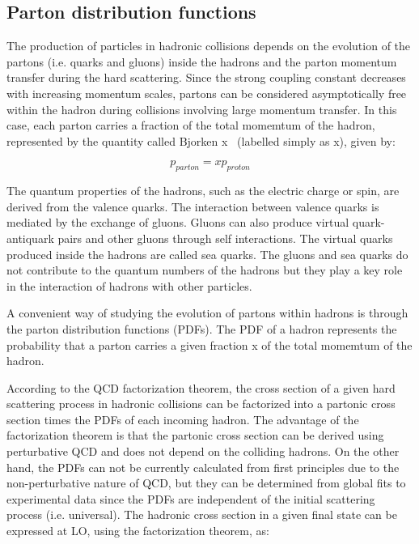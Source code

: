 \subsection{Parton distribution functions}\label{sec:PDF}

The production of particles in hadronic collisions depends on the evolution of the partons (i.e. quarks and gluons) inside the hadrons and the parton momentum transfer during the hard scattering. Since the strong coupling constant decreases with increasing momentum scales, partons can be considered asymptotically free within the hadron during collisions involving large momentum transfer. In this case, each parton carries a fraction of the total momemtum of the hadron, represented by the quantity called Bjorken x~\cite{BjorkenX} (labelled simply as x), given by:

\begin{equation}
p_{parton} = xp_{proton}
\end{equation}

The quantum properties of the hadrons, such as the electric charge or spin, are derived from the valence quarks. The interaction between valence quarks is mediated by the exchange of gluons. Gluons can also produce virtual quark-antiquark pairs and other gluons through self interactions. The virtual quarks produced inside the hadrons are called sea quarks. The gluons and sea quarks do not contribute to the quantum numbers of the hadrons but they play a key role in the interaction of hadrons with other particles.

A convenient way of studying the evolution of partons within hadrons is through the parton distribution functions (PDFs). The PDF of a hadron represents the probability that a parton carries a given fraction x of the total momemtum of the hadron.

According to the QCD factorization theorem, the cross section of a given hard scattering process in hadronic collisions can be factorized into a partonic cross section times the PDFs of each incoming hadron. The advantage of the factorization theorem is that the partonic cross section can be derived using perturbative QCD and does not depend on the colliding hadrons. On the other hand, the  PDFs can not be currently calculated from first principles due to the non-perturbative nature of QCD, but they can be determined from global fits to experimental data since the PDFs are independent of the initial scattering process (i.e. universal). The hadronic cross section in a given final state can be expressed at LO, using the factorization theorem, as:

